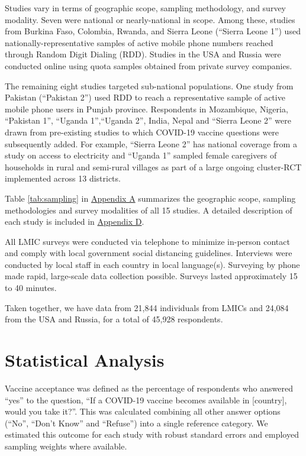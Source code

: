 \documentclass[
  12pt,
]{article}
\begin{document}
Studies vary in terms of geographic scope, sampling methodology, and survey modality. Seven were national or nearly-national in scope. Among these, studies from Burkina Faso, Colombia, Rwanda, and Sierra Leone (``Sierra Leone 1'') used nationally-representative samples of active mobile phone numbers reached through Random Digit Dialing (RDD). Studies in the USA and Russia were conducted online using quota samples obtained from private survey companies.

The remaining eight studies targeted sub-national populations. One study from Pakistan (``Pakistan 2'') used RDD to reach a representative sample of active mobile phone users in Punjab province. Respondents in Mozambique, Nigeria, ``Pakistan 1'', ``Uganda 1'',``Uganda 2'', India, Nepal and ``Sierra Leone 2'' were drawn from pre-existing studies to which COVID-19 vaccine questions were subsequently added. For example, ``Sierra Leone 2'' has national coverage from a study on access to electricity and ``Uganda 1'' sampled female caregivers of households in rural and semi-rural villages as part of a large ongoing cluster-RCT implemented across 13 districts.

Table \ref{tab:sampling} in \protect\hyperlink{appendixd}{Appendix A} summarizes the geographic scope, sampling methodologies and survey modalities of all 15 studies. A detailed description of each study is included in \protect\hyperlink{appendixa}{Appendix D}.

All LMIC surveys were conducted via telephone to minimize in-person contact and comply with local government social distancing guidelines. Interviews were conducted by local staff in each country in local language(s). Surveying by phone made rapid, large-scale data collection possible. Surveys lasted approximately 15 to 40 minutes.

Taken together, we have data from 21,844 individuals from LMICs and 24,084 from the USA and Russia, for a total of 45,928 respondents.

\hypertarget{statistical-analysis}{%
\section*{Statistical Analysis}\label{statistical-analysis}}

Vaccine acceptance was defined as the percentage of respondents who answered ``yes'' to the question, ``If a COVID-19 vaccine becomes available in {[}country{]}, would you take it?''. This was calculated combining all other answer options (``No'', ``Don't Know'' and ``Refuse'') into a single reference category. We estimated this outcome for each study with robust standard errors and employed sampling weights where available.
\end{document}
